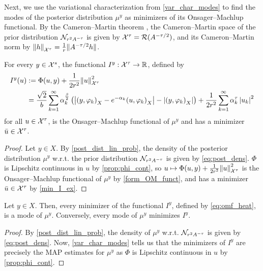 \documentclass[english]{jnsao}
\theoremstyle{definition}
\begin{document}
Next, we use the variational characterization from \cref{var_char_modes} to find the modes of the posterior distribution $\mu^y$ as minimizers of its Onsager--Machlup functional.
By the Cameron--Martin theorem \cite[Thm.~2.3.1]{DaPrato:2001}, the Cameron--Martin space of the prior distribution $\mathcal{N}_{r^2 A^{-\tau}}$ is given by ${\mathcal{X}^{\tau}} = \operatorname{\mathcal{R}}(A^{-\tau/2})$, and its Cameron--Martin norm by ${\lVert h\rVert}_{\mathcal{X}^{\tau}} = \frac{1}{r}{\lVert A^{-\tau/2}h\rVert}$.

\begin{theorem} 
	\label{thm:omf_heat}
	For every $y \in {\mathcal{X}^{s}}$, the functional $I^y: {\mathcal{X}^{\tau}} \to {\mathbb{R}}$, defined by
	\begin{align} 
		\label{eq:omf_heat}
		I^y(u) &:= \Phi(u,y) + \frac{1}{2r^2}{\lVert u\rVert}_{\mathcal{X}^{\tau}}^2 \\
		&= \frac{\sqrt{2}}{b} \sum_{k=1}^\infty \alpha_k^\frac{\beta}{2} \left(\left|{(y,\varphi_k)}_X - e^{-\alpha_k} {(u,\varphi_k)}_X\right| - \left|{(y,\varphi_k)}_X\right|\right) + \frac{1}{2r^2} \sum_{k=1}^\infty \alpha_k^\tau \left|u_k\right|^2 \nonumber
	\end{align}
	for all $u \in {\mathcal{X}^{\tau}}$, is the Onsager--Machlup functional of $\mu^y$ and has a minimizer $\bar u \in {\mathcal{X}^{\tau}}$.
\end{theorem}
\begin{proof}
	Let $y \in X$. By \cref{post_dist_lin_prob}, the density of the posterior distribution $\mu^y$ w.r.t. the prior distribution $\mathcal{N}_{r^2 A^{-\tau}}$ is given by \eqref{eq:post_dens}.
	$\Phi$ is Lipschitz continuous in $u$ by \cref{prop:phi_cont}, so $u \mapsto \Phi(u,y) + \frac{1}{2r^2}{\lVert u\rVert}_{\mathcal{X}^{\tau}}^2$ is the Onsager--Machlup functional of $\mu^y$ by \cref{form_OM_funct}, and has a minimizer $\bar u \in {\mathcal{X}^{\tau}}$ by \cref{min_I_ex}.
\end{proof}

\begin{corollary} 
	\label{cor:omf_min_map_heat}
	Let $y \in X$. Then, every minimizer of the functional $I^y$, defined by \eqref{eq:omf_heat}, is a mode of $\mu^y$. Conversely, every mode of $\mu^y$ minimizes $I^y$.
\end{corollary}
\begin{proof}
	By \cref{post_dist_lin_prob}, the density of $\mu^y$ w.r.t. $\mathcal{N}_{r^2 A^{-\tau}}$ is given by \eqref{eq:post_dens}.
	Now, \cref{var_char_modes} tells us that the minimizers of $I^y$ are precisely the MAP estimates for $\mu^y$ as $\Phi$ is Lipschitz continuous in $u$ by \cref{prop:phi_cont}.
\end{proof}
\end{document}

